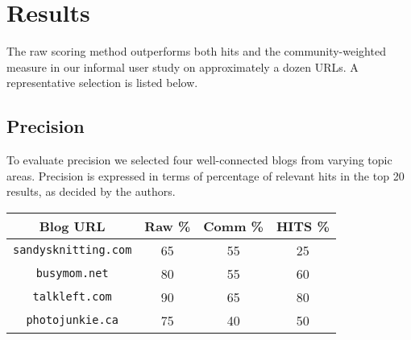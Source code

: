 \documentclass{sig-alternate-nocopyright}
\begin{document}




\section{Results}
The raw scoring method outperforms both hits and the community-weighted 
measure in our informal user study on approximately a dozen URLs.  A representative 
selection is listed below.
\subsection{Precision}
To evaluate precision we selected four well-connected blogs from
varying topic areas. Precision is expressed in terms of percentage of
relevant hits in the top 20 results, as decided by the authors.
\newline

\begin{tabular}{|c|c|c|c|}
\hline
Blog URL & Raw \% & Comm \% & HITS  \%\\
\hline
\texttt{sandysknitting.com} & 65 & 55 & 25 \\
\texttt{busymom.net} & 80 & 55 & 60 \\
\texttt{talkleft.com} & 90 & 65 & 80 \\
\texttt{photojunkie.ca} & 75 & 40 & 50 \\
\hline
\end{tabular}
\end{document}

